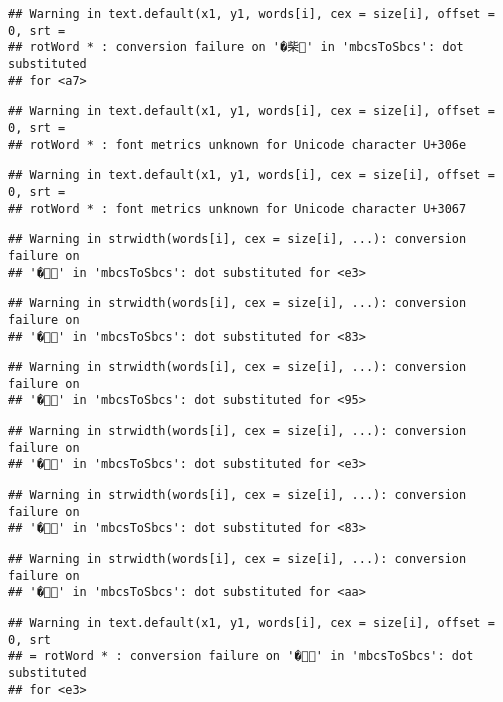 \documentclass[]{article}
\begin{document}
\begin{verbatim}
## Warning in text.default(x1, y1, words[i], cex = size[i], offset = 0, srt =
## rotWord * : conversion failure on '�柴' in 'mbcsToSbcs': dot substituted
## for <a7>
\end{verbatim}

\begin{verbatim}
## Warning in text.default(x1, y1, words[i], cex = size[i], offset = 0, srt =
## rotWord * : font metrics unknown for Unicode character U+306e
\end{verbatim}

\begin{verbatim}
## Warning in text.default(x1, y1, words[i], cex = size[i], offset = 0, srt =
## rotWord * : font metrics unknown for Unicode character U+3067
\end{verbatim}

\begin{verbatim}
## Warning in strwidth(words[i], cex = size[i], ...): conversion failure on
## '�' in 'mbcsToSbcs': dot substituted for <e3>
\end{verbatim}

\begin{verbatim}
## Warning in strwidth(words[i], cex = size[i], ...): conversion failure on
## '�' in 'mbcsToSbcs': dot substituted for <83>
\end{verbatim}

\begin{verbatim}
## Warning in strwidth(words[i], cex = size[i], ...): conversion failure on
## '�' in 'mbcsToSbcs': dot substituted for <95>
\end{verbatim}

\begin{verbatim}
## Warning in strwidth(words[i], cex = size[i], ...): conversion failure on
## '�' in 'mbcsToSbcs': dot substituted for <e3>
\end{verbatim}

\begin{verbatim}
## Warning in strwidth(words[i], cex = size[i], ...): conversion failure on
## '�' in 'mbcsToSbcs': dot substituted for <83>
\end{verbatim}

\begin{verbatim}
## Warning in strwidth(words[i], cex = size[i], ...): conversion failure on
## '�' in 'mbcsToSbcs': dot substituted for <aa>
\end{verbatim}

\begin{verbatim}
## Warning in text.default(x1, y1, words[i], cex = size[i], offset = 0, srt
## = rotWord * : conversion failure on '�' in 'mbcsToSbcs': dot substituted
## for <e3>
\end{verbatim}
\end{document}

